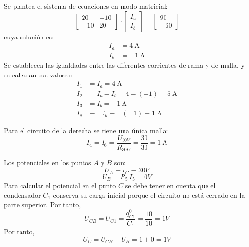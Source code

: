 Se plantea el sistema de ecuaciones en modo matricial:
\begin{equation*}
  \begin{bmatrix}
    20 & -10 \\
    -10 & 20
  \end{bmatrix} \cdot
  \begin{bmatrix}
    I_a\\
    I_b
  \end{bmatrix} = %
  \begin{bmatrix}
    90 \\
    -60
  \end{bmatrix}
\end{equation*}
cuya solución es:
\begin{align*}
  I_a&=\qty{4}{\ampere}\\
  I_b&=\qty{-1}{\ampere}
\end{align*}
Se establecen las igualdades entre las diferentes corrientes de rama y
de malla, y se calculan sus valores:
\begin{align*}
  I_1&=I_a=\qty{4}{\ampere}\\
  I_2&=I_a-I_b=4-(-1)=\qty{5}{\ampere}\\
  I_3&=I_b=\qty{-1}{\ampere}\\
  I_8&=-I_b=-(-1)=\qty{1}{\ampere}
\end{align*}
	
Para el circuito de la derecha se tiene una única malla:
\begin{equation*}
  {I_4=I_6=\dfrac{U_{30V}}{R_{30\Omega}}=\dfrac{30}{30}=\qty{1}{\ampere}}
\end{equation*}

Los potenciales en los puntos $A$ y $B$ son:
\begin{equation*}
  {U_A = \epsilon_C = {30} V}
\end{equation*}
\begin{equation*}
  U_B = R_5 \, I_5 = {0} V
\end{equation*}
Para calcular el potencial en el punto $C$ se debe tener en cuenta que
el condensador $C_1$ conserva su carga inicial porque el circuito no
está cerrado en la parte superior. Por tanto,
\begin{equation*}
  U_{CB} = U_{C1} = \dfrac{q^0_{C1} }{C_1} =\dfrac{10}{10}= {1 V}
\end{equation*}
Por tanto,
\begin{equation*}
  U_C = U_{CB} + U_B = 1+0={{1} V}
\end{equation*}

